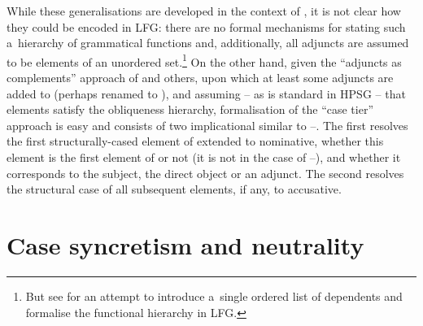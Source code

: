 \documentclass[output=paper
 	        ,biblatex
                ,babelshorthands
                ,newtxmath
                ,draftmode
                ,colorlinks, citecolor=brown
]{langscibook}
\begin{document}
While these generalisations are developed in the context of , it is
not clear how they could be encoded in LFG: there are no formal mechanisms for stating such
a~hierarchy of grammatical functions and, additionally, all adjuncts are assumed to be elements of
an unordered set.\footnote{But see \citet{Prze2016a} for an attempt to introduce a~single ordered
  list of dependents and formalise the functional hierarchy in LFG\@.} On the other hand, given the “adjuncts as complements” approach of \citet{BMS2001a} and
others, upon which at least some adjuncts are added to  (perhaps renamed to
), and assuming – as is standard in HPSG – that  elements satisfy the
obliqueness hierarchy, formalisation of the “case tier” approach is easy and consists of two
implicational  similar to –.
The first \skp[3] resolves the first structurally-cased element of 
extended  to nominative, whether this element is the first element of  or
not (it is not in the case of –), and whether it corresponds to the subject,
the direct object or an adjunct.  The second  resolves the structural
case of all subsequent elements, if any, to accusative.  





\section{Case syncretism and neutrality}
\label{sec:case:syn}
\end{document}
